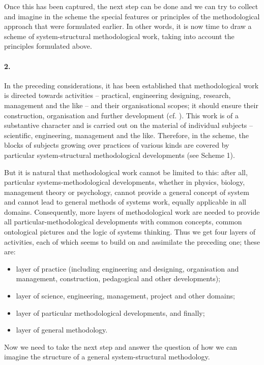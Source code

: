 \documentclass[11pt,a4paper]{article}
\begin{document}
Once this has been captured, the next step can be done and we can try to
collect and imagine in the scheme the special features or principles of the
methodological approach that were formulated earlier. In other words, it is
now time to draw a scheme of system-structural methodological work, taking
into account the principles formulated above.

\paragraph{2.}
In the preceding considerations, it has been established that methodological
work is directed towards activities – practical, engineering designing,
research, management and the like – and their organisational scopes; it should
ensure their construction, organisation and further development
(cf. \cite{Shchedrovitsky1969b, Development1975}). This work is of a
substantive character and is carried out on the material of individual
subjects – scientific, engineering, management and the like. Therefore, in the
scheme, the blocks of subjects growing over practices of various kinds are
covered by particular system-structural methodological developments (see
Scheme 1).

But it is natural that methodological work cannot be limited to this: after
all, particular systems-methodological developments, whether in physics,
biology, management theory or psychology, cannot provide a general concept of
system and cannot lead to general methods of systems work, equally applicable
in all domains. Consequently, more layers of methodological work are needed to
provide all particular-methodological developments with common concepts,
common ontological pictures and the logic of systems thinking. Thus we get
four layers of activities, each of which seems to build on and assimilate the
preceding one; these are:
\begin{itemize}[noitemsep]
\item layer of practice (including engineering and designing, organisation and
  management, construction, pedagogical and other developments);
\item layer of science, engineering, management, project and other domains; 
\item layer of particular methodological developments, and finally; 
\item layer of general methodology. 
\end{itemize}

Now we need to take the next step and answer the question of how we can
imagine the structure of a general system-structural methodology.
\end{document}
